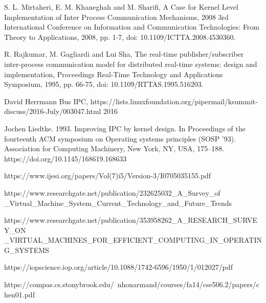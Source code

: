 \documentclass[12pt]{report}
\begin{document}
	\pagebreak
	\begin{thebibliography}{9}
		S. L. Mirtaheri, E. M. Khaneghah and M. Sharifi, 
		A Case for Kernel Level Implementation of Inter Process Communication Mechanisms,
		2008 3rd International Conference on Information and Communication Technologies: From Theory to Applications, 
		2008, pp. 1-7, doi: 10.1109/ICTTA.2008.4530360.
	
		R. Rajkumar, M. Gagliardi and Lui Sha, 
		The real-time publisher/subscriber inter-process communication model for distributed real-time systems: design and implementation, 
		Proceedings Real-Time Technology and Applications Symposium, 
		1995, pp. 66-75, doi: 10.1109/RTTAS.1995.516203. 

		David Herrmann
		Bus IPC, https://lists.linuxfoundation.org/pipermail/ksummit-discuss/2016-July/003047.html
		2016
		
		Jochen Liedtke. 1993. 
		Improving IPC by kernel design. In Proceedings of the fourteenth ACM symposium on Operating systems principles (SOSP '93). 
		Association for Computing Machinery, 
		New York, NY, USA, 175–188. 
		https://doi.org/10.1145/168619.168633

        https://www.ijesi.org/papers/Vol(7)i5/Version-3/I0705035155.pdf

        https://www.researchgate.net/publication/232625032\_A\_Survey\_of
        \_Virtual\_Machine\_System\_Current\_Technology\_and\_Future\_Trends

    https://www.researchgate.net/publication/353958262\_A\_RESEARCH\_SURVEY\_ON
    \_VIRTUAL\_MACHINES\_FOR\_EFFICIENT\_COMPUTING\_IN\_OPERATING\_SYSTEMS

    https://iopscience.iop.org/article/10.1088/1742-6596/1950/1/012027/pdf
 
    https://compas.cs.stonybrook.edu/~nhonarmand/courses/fa14/cse506.2/papers/chen01.pdf

	\end{thebibliography}
\end{document}
